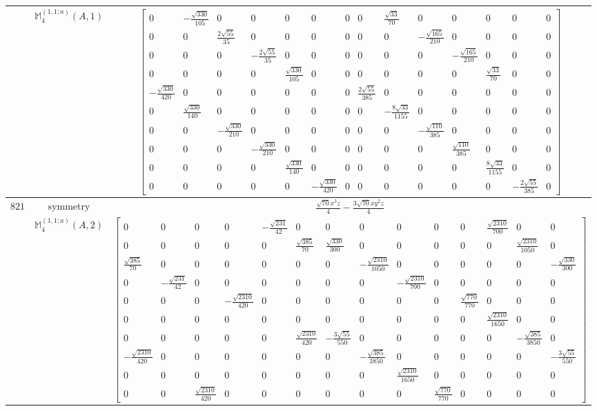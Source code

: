 \documentclass[fleqn,8pt,landscape]{jsarticle}
\begin{document}
\begin{longtable}{ccc}
$  $ & $ \mathbb{M}_{4}^{(1,1;a)}(A,1) $ & $ \begin{bmatrix} 0 & - \frac{\sqrt{330}}{105} & 0 & 0 & 0 & 0 & 0 & 0 & \frac{\sqrt{33}}{70} & 0 & 0 & 0 & 0 & 0 \\ 0 & 0 & \frac{2 \sqrt{55}}{35} & 0 & 0 & 0 & 0 & 0 & 0 & - \frac{\sqrt{165}}{210} & 0 & 0 & 0 & 0 \\ 0 & 0 & 0 & - \frac{2 \sqrt{55}}{35} & 0 & 0 & 0 & 0 & 0 & 0 & - \frac{\sqrt{165}}{210} & 0 & 0 & 0 \\ 0 & 0 & 0 & 0 & \frac{\sqrt{330}}{105} & 0 & 0 & 0 & 0 & 0 & 0 & \frac{\sqrt{33}}{70} & 0 & 0 \\ - \frac{\sqrt{330}}{420} & 0 & 0 & 0 & 0 & 0 & 0 & \frac{2 \sqrt{55}}{385} & 0 & 0 & 0 & 0 & 0 & 0 \\ 0 & \frac{\sqrt{330}}{140} & 0 & 0 & 0 & 0 & 0 & 0 & - \frac{8 \sqrt{33}}{1155} & 0 & 0 & 0 & 0 & 0 \\ 0 & 0 & - \frac{\sqrt{330}}{210} & 0 & 0 & 0 & 0 & 0 & 0 & - \frac{\sqrt{110}}{385} & 0 & 0 & 0 & 0 \\ 0 & 0 & 0 & - \frac{\sqrt{330}}{210} & 0 & 0 & 0 & 0 & 0 & 0 & \frac{\sqrt{110}}{385} & 0 & 0 & 0 \\ 0 & 0 & 0 & 0 & \frac{\sqrt{330}}{140} & 0 & 0 & 0 & 0 & 0 & 0 & \frac{8 \sqrt{33}}{1155} & 0 & 0 \\ 0 & 0 & 0 & 0 & 0 & - \frac{\sqrt{330}}{420} & 0 & 0 & 0 & 0 & 0 & 0 & - \frac{2 \sqrt{55}}{385} & 0 \end{bmatrix} $ \\ \hline
$ 821 $ & $ \text{symmetry} $ & $ \frac{\sqrt{70} x^{3} z}{4} - \frac{3 \sqrt{70} x y^{2} z}{4} $ \\
$  $ & $ \mathbb{M}_{4}^{(1,1;a)}(A,2) $ & $ \begin{bmatrix} 0 & 0 & 0 & 0 & - \frac{\sqrt{231}}{42} & 0 & 0 & 0 & 0 & 0 & 0 & \frac{\sqrt{2310}}{700} & 0 & 0 \\ 0 & 0 & 0 & 0 & 0 & \frac{\sqrt{385}}{70} & \frac{\sqrt{330}}{300} & 0 & 0 & 0 & 0 & 0 & \frac{\sqrt{2310}}{1050} & 0 \\ \frac{\sqrt{385}}{70} & 0 & 0 & 0 & 0 & 0 & 0 & - \frac{\sqrt{2310}}{1050} & 0 & 0 & 0 & 0 & 0 & - \frac{\sqrt{330}}{300} \\ 0 & - \frac{\sqrt{231}}{42} & 0 & 0 & 0 & 0 & 0 & 0 & - \frac{\sqrt{2310}}{700} & 0 & 0 & 0 & 0 & 0 \\ 0 & 0 & 0 & - \frac{\sqrt{2310}}{420} & 0 & 0 & 0 & 0 & 0 & 0 & \frac{\sqrt{770}}{770} & 0 & 0 & 0 \\ 0 & 0 & 0 & 0 & 0 & 0 & 0 & 0 & 0 & 0 & 0 & \frac{\sqrt{2310}}{1650} & 0 & 0 \\ 0 & 0 & 0 & 0 & 0 & \frac{\sqrt{2310}}{420} & - \frac{3 \sqrt{55}}{550} & 0 & 0 & 0 & 0 & 0 & - \frac{\sqrt{385}}{3850} & 0 \\ - \frac{\sqrt{2310}}{420} & 0 & 0 & 0 & 0 & 0 & 0 & - \frac{\sqrt{385}}{3850} & 0 & 0 & 0 & 0 & 0 & - \frac{3 \sqrt{55}}{550} \\ 0 & 0 & 0 & 0 & 0 & 0 & 0 & 0 & \frac{\sqrt{2310}}{1650} & 0 & 0 & 0 & 0 & 0 \\ 0 & 0 & \frac{\sqrt{2310}}{420} & 0 & 0 & 0 & 0 & 0 & 0 & \frac{\sqrt{770}}{770} & 0 & 0 & 0 & 0 \end{bmatrix} $ \\ \hline

\end{longtable}
\end{document}
